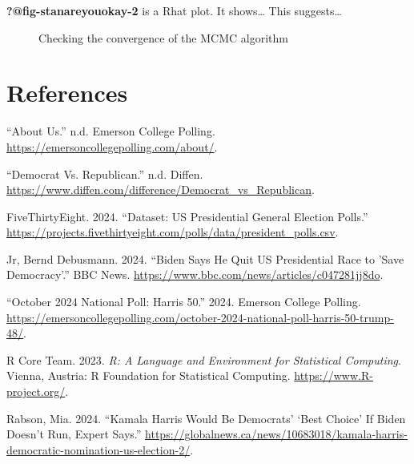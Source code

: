 \documentclass[
  letterpaper,
  DIV=11,
  numbers=noendperiod]{scrartcl}
\newlength{\cslhangindent}
\newenvironment{CSLReferences}[2] %
 {\begin{list}{}{%
  \setlength{\itemindent}{0pt}
  \setlength{\leftmargin}{0pt}
  \setlength{\parsep}{0pt}
  \ifodd #1
   \setlength{\leftmargin}{\cslhangindent}
   \setlength{\itemindent}{-1\cslhangindent}
  \fi
  \setlength{\itemsep}{#2\baselineskip}}}
 {\end{list}}
\begin{document}
\textbf{?@fig-stanareyouokay-2} is a Rhat plot. It shows\ldots{} This
suggests\ldots{}

\begin{figure}

\begin{minipage}{0.50\linewidth}
Checking the convergence of the MCMC algorithm\end{minipage}%

\end{figure}%

\newpage

\section*{References}\label{references}

\label{refs}
\begin{CSLReferences}{1}{0}
{``About Us.''} n.d. Emerson College Polling.
\url{https://emersoncollegepolling.com/about/}.

{``Democrat Vs. Republican.''} n.d. Diffen.
\url{https://www.diffen.com/difference/Democrat_vs_Republican}.

FiveThirtyEight. 2024. {``Dataset: US Presidential General Election
Polls.''}
\url{https://projects.fivethirtyeight.com/polls/data/president_polls.csv}.

Jr, Bernd Debusmann. 2024. {``Biden Says He Quit US Presidential Race to
'Save Democracy'.''} BBC News.
\url{https://www.bbc.com/news/articles/c047281jj8do}.

{``October 2024 National Poll: Harris 50.''} 2024. Emerson College
Polling.
\url{https://emersoncollegepolling.com/october-2024-national-poll-harris-50-trump-48/}.

R Core Team. 2023. \emph{{R: A Language and Environment for Statistical
Computing}}. Vienna, Austria: R Foundation for Statistical Computing.
\url{https://www.R-project.org/}.

Rabson, Mia. 2024. {``Kamala Harris Would Be Democrats' {`Best Choice'}
If Biden Doesn't Run, Expert Says.''}
\url{https://globalnews.ca/news/10683018/kamala-harris-democratic-nomination-us-election-2/}.

\end{CSLReferences}
\end{document}
